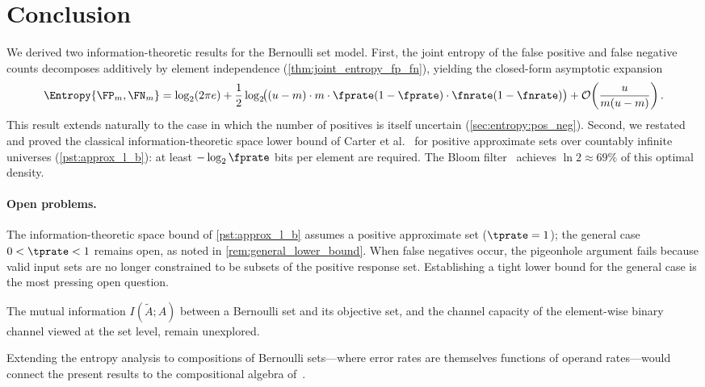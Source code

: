 \section{Conclusion}
\label{sec:conclusion_ent}

We derived two information-theoretic results for the Bernoulli set model.
First, the joint entropy of the false positive and false negative counts
decomposes additively by element independence
(\cref{thm:joint_entropy_fp_fn}), yielding the closed-form asymptotic
expansion
\begin{equation}
    \Entropy{\FP_m, \FN_m}
    = \log_2(2\pi e)
    + \frac{1}{2}\log_2\!\bigl(
        (u-m) \cdot m \cdot \fprate(1-\fprate) \cdot \fnrate(1-\fnrate)
      \bigr)
    + \mathcal{O}\!\left(\frac{u}{m(u-m)}\right).
\end{equation}
This result extends naturally to the case in which the number of positives is
itself uncertain (\cref{sec:entropy:pos_neg}).
Second, we restated and proved the classical information-theoretic space lower
bound of Carter et al.~\cite{carterExact} for positive approximate sets over
countably infinite universes (\cref{pst:approx_l_b}): at least
$-\log_2 \fprate$ bits per element are required.
The Bloom filter~\cite{bf} achieves $\ln 2 \approx 69\%$ of this optimal
density.

\paragraph{Open problems.}
The information-theoretic space bound of \cref{pst:approx_l_b} assumes a
positive approximate set ($\tprate = 1$); the general case $0 < \tprate < 1$
remains open, as noted in \cref{rem:general_lower_bound}.
When false negatives occur, the pigeonhole argument fails because valid input
sets are no longer constrained to be subsets of the positive response set.
Establishing a tight lower bound for the general case is the most pressing open
question.

The mutual information $I(\tilde{A}; A)$ between a Bernoulli set and its
objective set, and the channel capacity of the element-wise binary channel
viewed at the set level, remain unexplored.

Extending the entropy analysis to compositions of Bernoulli sets---where error
rates are themselves functions of operand rates---would connect the present
results to the compositional algebra of~\cite{bernoulliComposition}.
